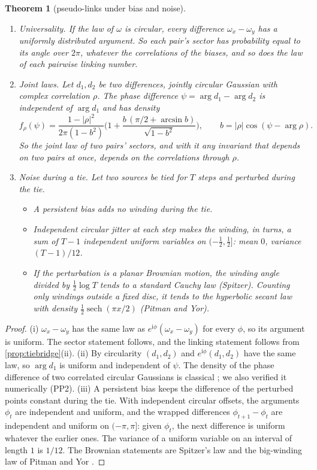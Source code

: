 \documentclass[11pt]{article}
\newtheorem{theorem}{Theorem}\newtheorem{proposition}[theorem]{Proposition}\newtheorem{lemma}[theorem]{Lemma}\newtheorem{corollary}[theorem]{Corollary}\newtheorem{conjecture}[theorem]{Conjecture}\crefname{conjecture}{Conjecture}{Conjectures}
\theoremstyle{definition}\newtheorem{definition}[theorem]{Definition}\newtheorem{remark}[theorem]{Remark}\newtheorem{example}[theorem]{Example}\newtheorem{problem}[theorem]{Open problem}\crefname{problem}{Problem}{Problems}
\begin{document}
\begin{theorem}[pseudo-links under bias and noise]\label{thm:pseudoprob}
\begin{enumerate}
\item[(i)] \emph{Universality.} If the law of $\omega$ is circular, every difference $\omega_x-\omega_y$ has a uniformly distributed argument. So each pair's sector has probability equal to its angle over $2\pi$, whatever the correlations of the biases, and so does the law of each pairwise linking number.
\item[(ii)] \emph{Joint laws.} Let $d_1,d_2$ be two differences, jointly circular Gaussian with complex correlation $\rho$. The phase difference $\psi=\arg d_1-\arg d_2$ is independent of $\arg d_1$ and has density
\[
f_\rho(\psi)=\frac{1-|\rho|^2}{2\pi(1-b^2)}\Big(1+\frac{b\,(\pi/2+\arcsin b)}{\sqrt{1-b^2}}\Big),\qquad b=|\rho|\cos(\psi-\arg\rho).
\]
So the joint law of two pairs' sectors, and with it any invariant that depends on two pairs at once, depends on the correlations through $\rho$.
\item[(iii)] \emph{Noise during a tie.} Let two sources be tied for $T$ steps and perturbed during the tie.
\begin{itemize}
\item A persistent bias adds no winding during the tie.
\item Independent circular jitter at each step makes the winding, in turns, a sum of $T-1$ independent uniform variables on $(-\tfrac12,\tfrac12]$: mean $0$, variance $(T-1)/12$.
\item If the perturbation is a planar Brownian motion, the winding angle divided by $\tfrac12\log T$ tends to a standard Cauchy law (Spitzer). Counting only windings outside a fixed disc, it tends to the hyperbolic secant law with density $\tfrac12\operatorname{sech}(\pi x/2)$ (Pitman and Yor).
\end{itemize}
\end{enumerate}
\end{theorem}

\begin{proof}
(i) $\omega_x-\omega_y$ has the same law as $e^{\mathrm i\phi}(\omega_x-\omega_y)$ for every $\phi$, so its argument is uniform. The sector statement follows, and the linking statement follows from \cref{prop:tiebridge}(ii). (ii) By circularity $(d_1,d_2)$ and $e^{\mathrm i\phi}(d_1,d_2)$ have the same law, so $\arg d_1$ is uniform and independent of $\psi$. The density of the phase difference of two correlated circular Gaussians is classical \cite{Goodman1985}; we also verified it numerically (PP2). (iii) A persistent bias keeps the difference of the perturbed points constant during the tie. With independent circular offsets, the arguments $\phi_t$ are independent and uniform, and the wrapped differences $\phi_{t+1}-\phi_t$ are independent and uniform on $(-\pi,\pi]$: given $\phi_t$, the next difference is uniform whatever the earlier ones. The variance of a uniform variable on an interval of length $1$ is $1/12$. The Brownian statements are Spitzer's law \cite{Spitzer1958} and the big-winding law of Pitman and Yor \cite{PitmanYor1986}.
\end{proof}
\end{document}
